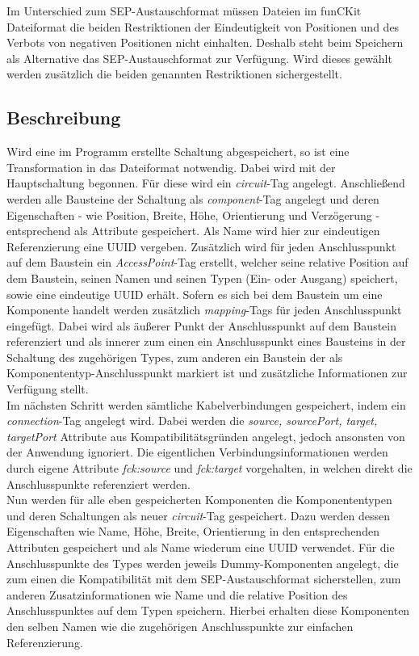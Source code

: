 \documentclass[12pt,a4paper]{scrartcl}
\newcommand{\projectName}{funCKit\xspace} %
\newcommand{\fckSEPFormat}{SEP-Austauschformat\xspace}
\begin{document}
\vspace{4mm}
Im Unterschied zum \fckSEPFormat müssen Dateien im \projectName Dateiformat die beiden Restriktionen der Eindeutigkeit von Positionen und des Verbots von negativen Positionen nicht einhalten. Deshalb steht beim Speichern als Alternative das \fckSEPFormat zur Verfügung. Wird dieses gewählt werden zusätzlich die beiden genannten Restriktionen sichergestellt.

\subsection{Beschreibung}
Wird eine im Programm erstellte Schaltung abgespeichert, so ist eine Transformation in das Dateiformat notwendig. Dabei wird mit der Hauptschaltung begonnen. Für diese wird ein \textit{circuit}-Tag angelegt. Anschließend werden alle Bausteine der Schaltung als \textit{component}-Tag angelegt und deren Eigenschaften - wie Position, Breite, Höhe, Orientierung und Verzögerung - entsprechend als Attribute gespeichert. Als Name wird hier zur eindeutigen Referenzierung eine UUID vergeben. Zusätzlich wird für jeden Anschlusspunkt auf dem Baustein ein \textit{AccessPoint}-Tag erstellt, welcher seine relative Position auf dem Baustein, seinen Namen und seinen Typen (Ein- oder Ausgang) speichert, sowie eine eindeutige UUID erhält. Sofern es sich bei dem Baustein um eine Komponente handelt werden zusätzlich \textit{mapping}-Tags für jeden Anschlusspunkt eingefügt. Dabei wird als äußerer Punkt der Anschlusspunkt auf dem Baustein referenziert und als innerer zum einen ein Anschlusspunkt eines Bausteins in der Schaltung des zugehörigen Types, zum anderen ein Baustein der als Komponententyp-Anschlusspunkt markiert ist und zusätzliche Informationen zur Verfügung stellt. \\
Im nächsten Schritt werden sämtliche Kabelverbindungen gespeichert, indem ein \textit{connection}-Tag angelegt wird. Dabei werden die \textit{source, sourcePort, target, targetPort} Attribute aus Kompatibilitätsgründen angelegt, jedoch ansonsten von der Anwendung ignoriert. Die eigentlichen Verbindungsinformationen werden durch eigene Attribute \textit{fck:source} und \textit{fck:target} vorgehalten, in welchen direkt die Anschlusspunkte referenziert werden. \\
Nun werden für alle eben gespeicherten Komponenten die Komponententypen und deren Schaltungen als neuer \textit{circuit}-Tag gespeichert. Dazu werden dessen Eigenschaften wie Name, Höhe, Breite, Orientierung in den entsprechenden Attributen gespeichert und als Name wiederum eine UUID verwendet. Für die Anschlusspunkte des Types werden jeweils Dummy-Komponenten angelegt, die zum einen die Kompatibilität mit dem \fckSEPFormat sicherstellen, zum anderen Zusatzinformationen wie Name und die relative Position des Anschlusspunktes auf dem Typen speichern. Hierbei erhalten diese Komponenten den selben Namen wie die zugehörigen Anschlusspunkte zur einfachen Referenzierung. \\
\end{document}
